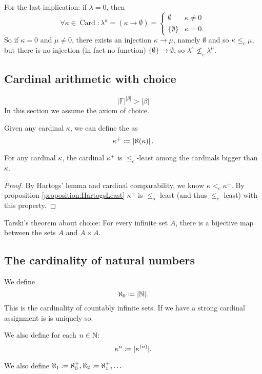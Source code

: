 For the last implication: if $\lambda = 0$, then
\[ \forall \kappa \in \operatorname{Card}: \lambda^\kappa = (\kappa\to\emptyset) = \begin{cases}
\emptyset & \kappa \neq 0 \\
\{\emptyset\} & \kappa = 0.
\end{cases} \]
So if $\kappa = 0$ and $\mu\neq 0$, there exists an injection $\kappa\to\mu$, namely $\emptyset$ and so $\kappa\leq_c \mu$, but there is no injection (in fact no function) $\{\emptyset\}\to\emptyset$, so $\lambda^\kappa \nleq_c \lambda^\mu$.

\subsection{Cardinal arithmetic with choice}
\[ |\mathbb{F}|^{|\beta|} > |\beta| \]
In this section we assume the axiom of choice.
\begin{definition}
Given any cardinal $\kappa$, we can define the  as
\[ \kappa^+ \coloneqq \left|\aleph(\kappa)\right|. \]
\end{definition}

\begin{lemma}
For any cardinal $\kappa$, the cardinal $\kappa^+$ is $\leq_c$-least among the cardinals bigger than $\kappa$.
\end{lemma}
\begin{proof}
By Hartogs' lemma and cardinal comparability, we know $\kappa <_c \kappa^+$. By proposition \ref{proposition:HartogsLeast} $\kappa^+$ is $\leq_o$-least (and thus $\leq_c$-least) with this property.
\end{proof}

Tarski's theorem about choice: For every infinite set $A$, there is a bijective map between the sets $A$ and $A\times A$.

\subsection{The cardinality of natural numbers}
\begin{definition}
We define
\[ \aleph_0 \coloneqq |\mathbb{N}|. \]
This is the cardinality of countably infinite sets. If we have a strong cardinal assignment is is uniquely so.

We also define for each $n\in \mathbb{N}$:
\[ \kappa^n \coloneqq |\kappa^{(n)}|. \]
\end{definition}
We also define $\aleph_1 \coloneqq \aleph_0^+,\aleph_2 \coloneqq \aleph_1^+,\ldots $

